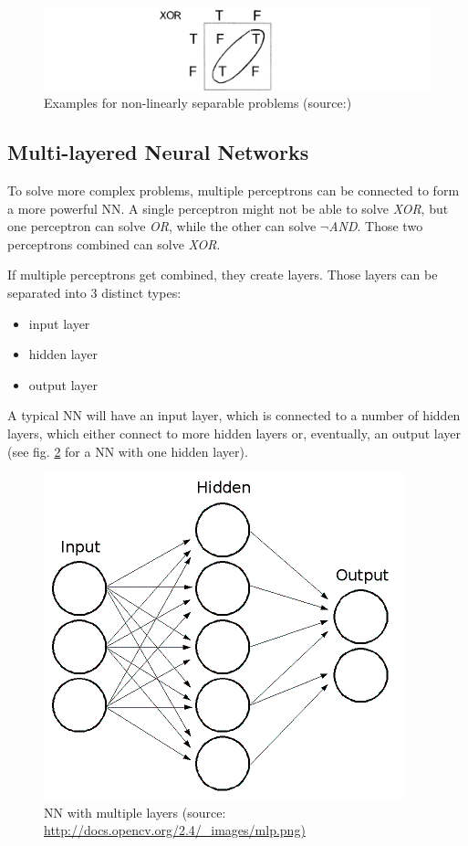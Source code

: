 \begin{figure}[H]
	\begin{center}
		\includegraphics[scale=0.75]{img/nlsp.png}
		\caption{Examples for non-linearly separable problems (source:\cite{Shiffman12})}
		\label{fig2_nonLinear}
	\end{center}
\end{figure}


\subsection{Multi-layered Neural Networks}
To solve more complex problems, multiple perceptrons can be connected to form a more powerful NN. A single perceptron might not be able to solve \emph{XOR}, but one perceptron can solve \emph{OR}, while the other can solve \emph{$\neg$AND}. Those two perceptrons combined can solve \emph{XOR}\cite{Shiffman12}.

If multiple perceptrons get combined, they create layers. Those layers can be separated into 3 distinct types\cite{Stergiou96}:
\begin{itemize}
	\item input layer
	\item hidden layer
	\item output layer
\end{itemize}

A typical NN will have an input layer, which is connected to a number of hidden layers, which either connect to more hidden layers or, eventually, an output layer (see fig. \ref{fig2_multilayeredNN} for a NN with one hidden layer).

\begin{figure}[H]
	\begin{center}
		\includegraphics[scale=0.8]{img/mlp.png}
		\caption{NN with multiple layers (source: \url{http://docs.opencv.org/2.4/_images/mlp.png)}}
		\label{fig2_multilayeredNN}
	\end{center}
\end{figure}

